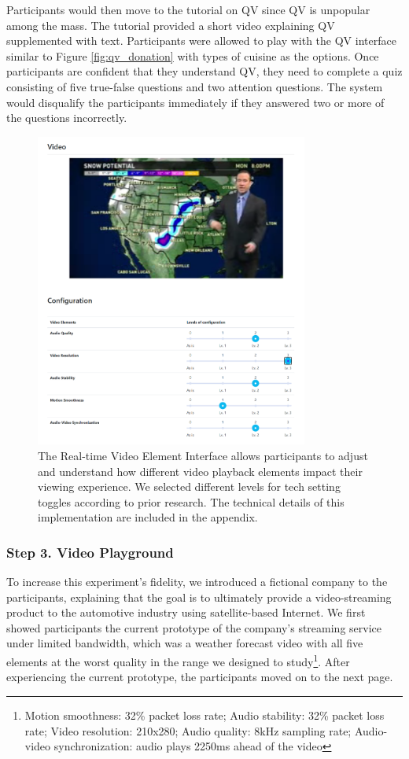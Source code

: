 Participants would then move to the tutorial on QV since QV is unpopular among the mass. The tutorial provided a short video explaining QV supplemented with text. Participants were allowed to play with the QV interface similar to Figure \ref{fig:qv_donation} with types of cuisine as the options. Once participants are confident that they understand QV, they need to complete a quiz consisting of five true-false questions and two attention questions. The system would disqualify the participants immediately if they answered two or more of the questions incorrectly.

\begin{figure}[htpb]
    \centering
    \includegraphics[width=0.8\textwidth, keepaspectratio=true]{content/image/video_playground.png}
    \caption{
        The Real-time Video Element Interface allows participants to adjust and understand how different video playback elements impact their viewing experience. We selected different levels for tech setting toggles according to prior research. The technical details of this implementation are included in the appendix.
    }
    \label{fig:exp2_playground}
\end{figure}


\subsubsection{Step 3. Video Playground}
To increase this experiment's fidelity, we introduced a fictional company to the participants, explaining that the goal is to ultimately provide a video-streaming product to the automotive industry using satellite-based Internet. We first showed participants the current prototype of the company's streaming service under limited bandwidth, which was a weather forecast video with all five elements at the worst quality in the range we designed to study\footnote{Motion smoothness: 32\% packet loss rate; Audio stability: 32\% packet loss rate; Video resolution: 210x280; Audio quality: 8kHz sampling rate; Audio-video synchronization: audio plays 2250ms ahead of the video}. After experiencing the current prototype, the participants moved on to the next page.

